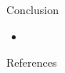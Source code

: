\documentclass[final,hyperref={pdfpagelabels=false}]{beamer}
\begin{document}
\begin{frame}[t]
\begin{columns}[t]
\begin{column}{.485\textwidth}
\begin{block}{Conclusion}
\begin{itemize}
  \item 
    


\end{itemize}
\end{block}













\begin{block}{References}
        

\end{block}
\end{column}
\end{columns}
\end{frame}
\end{document}

